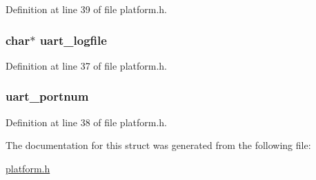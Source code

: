Definition at line 39 of file platform.h.

\hypertarget{struct____options_ac18c89a10926fd45241dc3ccf4150d1d}{
\subsubsection[{uart\_\-logfile}]{\setlength{\rightskip}{0pt plus 5cm}char$\ast$ {\bf uart\_\-logfile}}}
\label{struct____options_ac18c89a10926fd45241dc3ccf4150d1d}


Definition at line 37 of file platform.h.

\hypertarget{struct____options_a27bc7cd2c5dab1b6124ffe28df00f541}{
\subsubsection[{uart\_\-portnum}]{ {\bf uart\_\-portnum}}}
\label{struct____options_a27bc7cd2c5dab1b6124ffe28df00f541}


Definition at line 38 of file platform.h.



The documentation for this struct was generated from the following file:\begin{DoxyCompactItemize}
\item 
\hyperlink{platform_8h}{platform.h}\end{DoxyCompactItemize}
